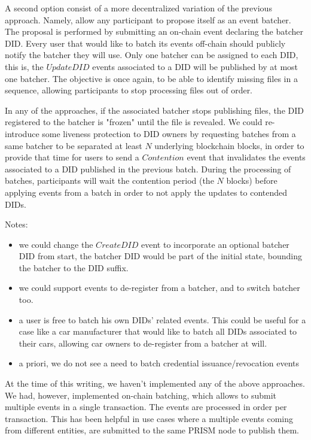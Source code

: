 \documentclass[10pt,a4paper]{article}
\begin{document}
A second option consist of a more decentralized variation of the previous approach. Namely, allow any participant to propose itself as an event 
batcher. The proposal is performed by submitting an on-chain event declaring the batcher DID. Every user that would like to batch its events 
off-chain should publicly notify the batcher they will use. Only one batcher can be assigned to each DID, this is, the $UpdateDID$ events associated 
to a DID will be published by at most one batcher. The objective is once again, to be able to identify missing files in a sequence, allowing 
participants to stop processing files out of order. 

In any of the approaches, if the associated batcher stops publishing files, the DID registered to the batcher is "frozen" until the file is revealed.
We could re-introduce some liveness protection to DID owners by requesting batches from a same batcher to be separated at least $N$ underlying 
blockchain blocks, in order to provide that time for users to send a $Contention$ event that invalidates the events associated to a DID published in
the previous batch. During the processing of batches, participants will wait the contention period (the $N$ blocks) before applying events from a 
batch in order to not apply the updates to contended DIDs.

Notes:
\begin{itemize}
\item we could change the $CreateDID$ event to incorporate an optional batcher DID from start, the batcher DID would be part of the initial state, 
      bounding the batcher to the DID suffix. 
\item we could support events to de-register from a batcher, and to switch batcher too.
\item a user is free to batch his own DIDs' related events. This could be useful for a case like a car manufacturer that would like to batch all DIDs
      associated to their cars, allowing car owners to de-register from a batcher at will.
\item a priori, we do not see a need to batch credential issuance/revocation events
\end{itemize}

At the time of this writing, we haven't implemented any of the above approaches. We had, however, implemented on-chain batching, which allows to submit multiple events in a single transaction. The events are processed in order per transaction. This has been helpful in use cases where a multiple events coming from different entities, are submitted to the same PRISM node to publish them.
\end{document}

